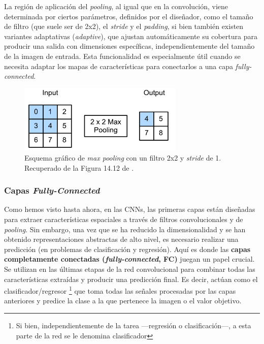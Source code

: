 La región de aplicación del \textit{pooling}, al igual que en la convolución, viene determinada por ciertos 
parámetros, definidos por el diseñador, como el tamaño de filtro (que suele ser de 2x2), el \textit{stride} 
y el \textit{padding}, si bien también existen variantes  adaptativas (\textit{adaptive}), que ajustan
automáticamente su cobertura para producir una salida con dimensiones específicas, independientemente del 
tamaño de la imagen de entrada. Esta funcionalidad es especialmente útil cuando se necesita adaptar los mapas
de características para conectarlos a una capa \textit{fully-connected}. 

\begin{figure}[h]
    \centering
    \includegraphics[width=0.7\textwidth]{capitulos/cap_02/imagenes/max_pooling.png}
    \caption{
        Esquema gráfico de \textit{max pooling} con un filtro 2x2 y \textit{stride} de 1.
        Recuperado de la Figura 14.12 de \cite{murphy2022}.
    } 
    \label{fig:max_pooling}
\end{figure}



\subsubsection{Capas \textit{Fully-Connected}}

Como hemos visto hasta ahora, en las CNNs, las primeras capas están diseñadas para extraer características
espaciales a través de filtros convolucionales y de \textit{pooling}. Sin embargo, una vez que se ha reducido 
la dimensionalidad y se han obtenido representaciones abstractas de alto nivel, es necesario realizar una 
predicción (en problemas de clasificación y regresión). 
Aquí es donde las \textbf{capas completamente conectadas (\textit{fully-connected}, FC)} juegan un papel 
crucial. Se utilizan en las últimas etapas de la red convolucional para combinar todas las características 
extraídas y producir una predicción final. Es decir, actúan como el clasificador/regresor%
\footnote{
    Si bien, independientemente de la tarea ---regresión o clasificación---, a esta parte de la red se le 
    denomina clasificador
} 
que toma todas las señales procesadas por las capas anteriores y predice la clase a la que pertenece la imagen 
o el valor objetivo. 

